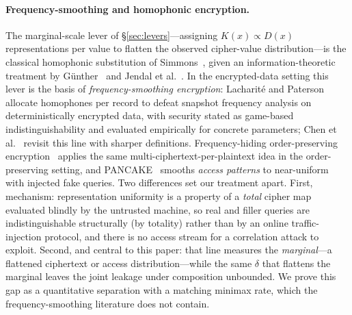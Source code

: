 \documentclass[11pt]{article}
\theoremstyle{definition}
\theoremstyle{plain}
\theoremstyle{remark}
\begin{document}
\paragraph{Frequency-smoothing and homophonic encryption.}
The marginal-scale lever of \S\ref{sec:levers}---assigning $K(x) \propto
D(x)$ representations per value to flatten the observed cipher-value
distribution---is the classical homophonic substitution of
Simmons~\cite{simmons1979symmetric}, given an information-theoretic
treatment by G{\"u}nther~\cite{gunther1988universal} and Jendal et
al.~\cite{jendal1989information}.  In the encrypted-data setting this
lever is the basis of \emph{frequency-smoothing encryption}: Lacharit{\'e}
and Paterson~\cite{lacharite2018frequency} allocate homophones per record
to defeat snapshot frequency analysis on deterministically encrypted data,
with security stated as game-based indistinguishability and evaluated
empirically for concrete parameters; Chen et
al.~\cite{chen2024revisiting} revisit this line with sharper definitions.
Frequency-hiding order-preserving encryption~\cite{kerschbaum2015frequency}
applies the same multi-ciphertext-per-plaintext idea in the order-preserving
setting, and PANCAKE~\cite{grubbs2020pancake} smooths \emph{access patterns}
to near-uniform with injected fake queries.  Two differences set our
treatment apart.  First, mechanism: representation uniformity is a property
of a \emph{total} cipher map evaluated blindly by the untrusted machine, so
real and filler queries are indistinguishable structurally (by totality)
rather than by an online traffic-injection protocol, and there is no access
stream for a correlation attack to exploit.  Second, and central to this
paper: that line measures the \emph{marginal}---a flattened ciphertext or
access distribution---while the same $\delta$ that flattens the marginal
leaves the joint leakage under composition unbounded.  We prove this gap
as a quantitative separation with a matching minimax rate, which the
frequency-smoothing literature does not contain.
\end{document}
